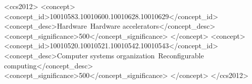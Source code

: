 \documentclass[sigconf]{acmart}
\begin{document}


\renewcommand{\shortauthors}{Shulin Zeng and Jun Liu, et al.}

\begin{abstract}

\end{abstract}

\begin{CCSXML}
<ccs2012>
   <concept>
       <concept_id>10010583.10010600.10010628.10010629</concept_id>
       <concept_desc>Hardware~Hardware accelerators</concept_desc>
       <concept_significance>500</concept_significance>
       </concept>
   <concept>
       <concept_id>10010520.10010521.10010542.10010543</concept_id>
       <concept_desc>Computer systems organization~Reconfigurable computing</concept_desc>
       <concept_significance>500</concept_significance>
       </concept>
 </ccs2012>
\end{CCSXML}



\end{document}

